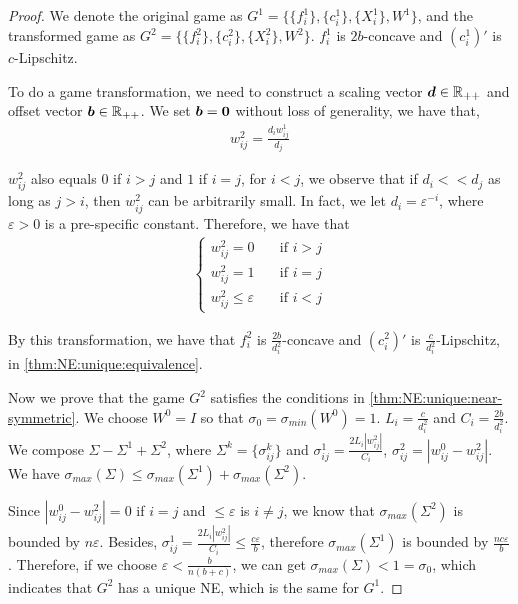 \begin{proof}
\label{prf:thm:case:2}
We denote the original game as $G^1 = \{\{f^1_i\},\{c^1_i\},\{X^1_i\},W^1\}$, and the transformed game as $G^2 = \{\{f^2_i\},\{c^2_i\},\{X^2_i\},W^2\}$. $f^1_i$ is $2b$-concave and $(c^{1}_i)'$ is $c$-Lipschitz.

To do a game transformation, we need to construct a scaling vector ${\bm{d}}\in\mathbb{R}_{++}$ and offset vector ${\bm{b}}\in\mathbb{R}_{++}$. We set ${\bm{b}} = \mathbf{0}$ without loss of generality, we have that,
\begin{align*}
    w^2_{ij} = \frac{d_i w^1_{ij}}{d_j}
\end{align*}

$w^2_{ij}$ also equals  $0$ if $i>j$ and $1$ if $i = j$, for $i<j$, we observe that if $d_i << d_j$ as long as $j>i$, then $w^2_{ij}$ can be arbitrarily small. 
In fact, we let $d_i = \varepsilon^{-i}$,
where $\varepsilon>0$ is a pre-specific constant. Therefore, we have that
\begin{align*}
    \begin{cases}
    w^2_{ij} =0\quad &\text{if $i>j$}
    \\
    w^2_{ij} =1\quad &\text{if $i = j$}
    \\
    w^2_{ij} \le \varepsilon &\text{if $i<j$} 
    \end{cases}
\end{align*}

By this transformation, we have that $f^2_i$ is $\frac{2b}{d^2_i}$-concave and $(c^2_i)'$ is $\frac{c}{d^2_i}$-Lipschitz, in \cref{thm:NE:unique:equivalence}.

Now we prove that the game $G^2$ satisfies the conditions in \cref{thm:NE:unique:near-symmetric}. We choose $W^0=I$ so that $\sigma_0 = \sigma_{min}(W^0) = 1$. $L_i = \frac{c}{d^2_i}$ and $C_i = \frac{2b}{d^2_i}$. We compose $\Sigma - \Sigma^1 + \Sigma^2$, where $\Sigma^k = \{\sigma^k_{ij}\}$ and $\sigma^1_{ij} = \frac{2L_i |w^2_{ij}|}{C_i}$, $\sigma^2_{ij} = | w^0_{ij} - w^2_{ij}|$. We have $\sigma_{max}(\Sigma) \le \sigma_{max}(\Sigma^1) + \sigma_{max}(\Sigma^2)$.

Since $|w^0_{ij}-w^2_{ij} |= 0 $ if $i=j$ and $\le \varepsilon$ is $i\ne j$, we know that $\sigma_{max}(\Sigma^2)$ is bounded by $n\varepsilon$. Besides, $\sigma^1_{ij} = \frac{2L_i |w^2_{ij}|}{C_i} \le \frac{c\varepsilon}{b}$, therefore $\sigma_{max}(\Sigma^1)$ is bounded by $\frac{nc\varepsilon}{b}$.
Therefore, if we choose $\varepsilon<\frac{b}{n(b+c)}$, we can get $\sigma_{max}(\Sigma) < 1 = \sigma_0$, which indicates that $G^2$ has a unique NE, which is the same for $G^1$.


\end{proof}